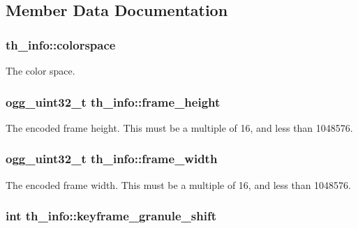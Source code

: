 \subsection{Member Data Documentation}
\hypertarget{structth__info_a8c7828cd0e023e9d21108160d53659a6}{
\subsubsection[{colorspace}]{ th\+\_\+info\+::colorspace}}\label{structth__info_a8c7828cd0e023e9d21108160d53659a6}
The color space. \hypertarget{structth__info_a6b1adc3a16a8336a72692b0a5937214c}{
\subsubsection[{frame\+\_\+height}]{\setlength{\rightskip}{0pt plus 5cm}ogg\+\_\+uint32\+\_\+t th\+\_\+info\+::frame\+\_\+height}}\label{structth__info_a6b1adc3a16a8336a72692b0a5937214c}
The encoded frame height. This must be a multiple of 16, and less than 1048576. \hypertarget{structth__info_a6b8087a4d831da53011a43b8d74087a0}{
\subsubsection[{frame\+\_\+width}]{\setlength{\rightskip}{0pt plus 5cm}ogg\+\_\+uint32\+\_\+t th\+\_\+info\+::frame\+\_\+width}}\label{structth__info_a6b8087a4d831da53011a43b8d74087a0}
The encoded frame width. This must be a multiple of 16, and less than 1048576. \hypertarget{structth__info_a693ca4ab11fbc0c3f32594b4bb8766ed}{
\subsubsection[{keyframe\+\_\+granule\+\_\+shift}]{\setlength{\rightskip}{0pt plus 5cm}int th\+\_\+info\+::keyframe\+\_\+granule\+\_\+shift}}\label{structth__info_a693ca4ab11fbc0c3f32594b4bb8766ed}
